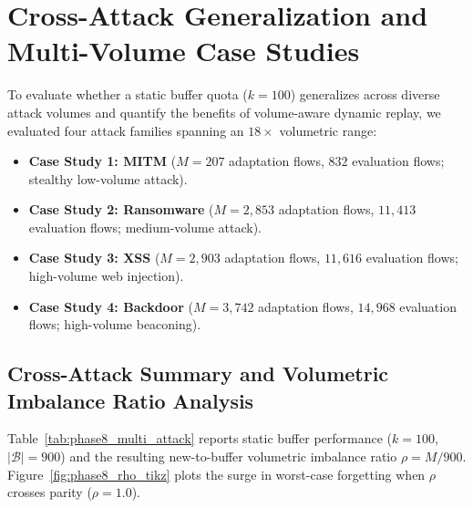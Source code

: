 \section{Cross-Attack Generalization and Multi-Volume Case Studies}
\label{sec:phase8_9_10_results}

To evaluate whether a static buffer quota ($k = 100$) generalizes across diverse attack volumes and quantify the benefits of volume-aware dynamic replay, we evaluated four attack families spanning an $18\times$ volumetric range:
\begin{itemize}
    \item \textbf{Case Study 1: MITM} ($M = 207$ adaptation flows, $832$ evaluation flows; stealthy low-volume attack).
    \item \textbf{Case Study 2: Ransomware} ($M = 2{,}853$ adaptation flows, $11{,}413$ evaluation flows; medium-volume attack).
    \item \textbf{Case Study 3: XSS} ($M = 2{,}903$ adaptation flows, $11{,}616$ evaluation flows; high-volume web injection).
    \item \textbf{Case Study 4: Backdoor} ($M = 3{,}742$ adaptation flows, $14{,}968$ evaluation flows; high-volume beaconing).
\end{itemize}

\subsection{Cross-Attack Summary and Volumetric Imbalance Ratio Analysis}
\label{subsec:cross_attack_summary}

Table~\ref{tab:phase8_multi_attack} reports static buffer performance ($k=100$, $|\mathcal{B}|=900$) and the resulting new-to-buffer volumetric imbalance ratio $\rho = M / 900$. Figure~\ref{fig:phase8_rho_tikz} plots the surge in worst-case forgetting when $\rho$ crosses parity ($\rho = 1.0$).

